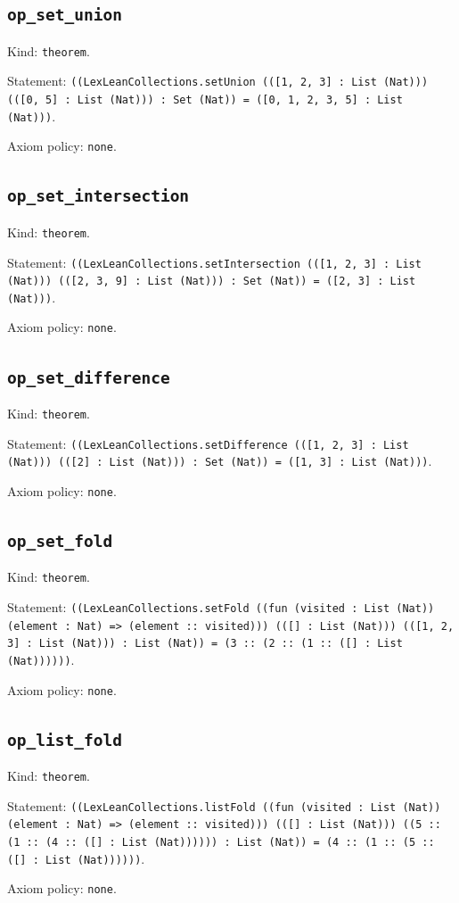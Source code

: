 \documentclass[11pt]{article}
\begin{document}
\subsection*{\texttt{op\_set\_union}}
\noindent Kind: \texttt{theorem}.\par
\noindent Statement: \texttt{((LexLeanCollections.setUnion (([1, 2, 3] : List (Nat))) (([0, 5] : List (Nat))) : Set (Nat)) = ([0, 1, 2, 3, 5] : List (Nat)))}.\par
\noindent Axiom policy: \texttt{none}.\par
\subsection*{\texttt{op\_set\_intersection}}
\noindent Kind: \texttt{theorem}.\par
\noindent Statement: \texttt{((LexLeanCollections.setIntersection (([1, 2, 3] : List (Nat))) (([2, 3, 9] : List (Nat))) : Set (Nat)) = ([2, 3] : List (Nat)))}.\par
\noindent Axiom policy: \texttt{none}.\par
\subsection*{\texttt{op\_set\_difference}}
\noindent Kind: \texttt{theorem}.\par
\noindent Statement: \texttt{((LexLeanCollections.setDifference (([1, 2, 3] : List (Nat))) (([2] : List (Nat))) : Set (Nat)) = ([1, 3] : List (Nat)))}.\par
\noindent Axiom policy: \texttt{none}.\par
\subsection*{\texttt{op\_set\_fold}}
\noindent Kind: \texttt{theorem}.\par
\noindent Statement: \texttt{((LexLeanCollections.setFold ((fun (visited : List (Nat)) (element : Nat) => (element :: visited))) (([] : List (Nat))) (([1, 2, 3] : List (Nat))) : List (Nat)) = (3 :: (2 :: (1 :: ([] : List (Nat))))))}.\par
\noindent Axiom policy: \texttt{none}.\par
\subsection*{\texttt{op\_list\_fold}}
\noindent Kind: \texttt{theorem}.\par
\noindent Statement: \texttt{((LexLeanCollections.listFold ((fun (visited : List (Nat)) (element : Nat) => (element :: visited))) (([] : List (Nat))) ((5 :: (1 :: (4 :: ([] : List (Nat)))))) : List (Nat)) = (4 :: (1 :: (5 :: ([] : List (Nat))))))}.\par
\noindent Axiom policy: \texttt{none}.\par
\end{document}
